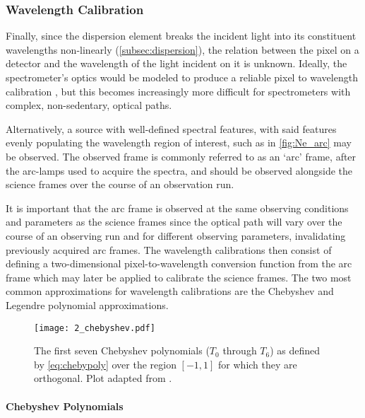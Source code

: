 \subsubsection{Wavelength Calibration}

Finally, since the dispersion element breaks the incident light into its constituent wavelengths non-linearly (\autoref{subsec:dispersion}), the relation between the pixel on a detector and the wavelength of the light incident on it is unknown.
Ideally, the spectrometer's optics would be modeled to produce a reliable pixel to wavelength calibration \citep[see e.g.,][]{WavCalSpectraModel}, but this becomes increasingly more difficult for spectrometers with complex, non-sedentary, optical paths.

Alternatively, a source with well-defined spectral features, with said features evenly populating the wavelength region of interest, such as in \autoref{fig:Ne_arc} may be observed.
The observed frame is commonly referred to as an `arc' frame, after the arc-lamps used to acquire the spectra, and should be observed alongside the science frames over the course of an observation run.

It is important that the arc frame is observed at the same observing conditions and parameters as the science frames since the optical path will vary over the course of an observing run and for different observing parameters, invalidating previously acquired arc frames.
The wavelength calibrations then consist of defining a two-dimensional pixel-to-wave\-length conversion function from the arc frame which may later be applied to calibrate the science frames.
The two most common approximations for wavelength calibrations are the Chebyshev and Legendre polynomial approximations.

\begin{figure}[t]
    \centering
    \texttt{[image: 2\_chebyshev.pdf]}
    \caption{
        The first seven Chebyshev polynomials ($T_0$ through $T_{6}$) as defined by \autoref{eq:chebypoly} over the region $[-1, 1]$ for which they are orthogonal.
        Plot adapted from \citep{numerical_recipes}.\protect\footnotemark
    }
    \label{fig:chebyshev}
\end{figure}

\paragraph{Chebyshev Polynomials}

